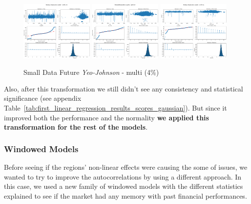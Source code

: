 \documentclass[11pt,english,a4paper,hidelinks]{book}
\begin{document}
\begin{figure}[H]
    \centering
    \includegraphics[width=0.32\textwidth]{images/code/models/linear_regression/first_model/Multi/quality_profit_1m_residuals - Gaussian.png}
    \includegraphics[width=0.32\textwidth]{images/code/models/linear_regression/first_model/Multi/quality_profit_1y_residuals - Gaussian.png}
    \includegraphics[width=0.32\textwidth]{images/code/models/linear_regression/first_model/Multi/quality_profit_5y_residuals - Gaussian.png}
    \caption{Small Data Future \textit{Yeo-Johnson} - \acrshort{multi} (4\%)}
    \label{fig:first_linear_regression_gaussian_residuals}
\end{figure}

\noindent Also, after this transformation we still didn't see any consistency and statistical significance (see appendix Table~\ref{tab:first_linear_regression_results_scores_gaussian}). But since it improved both the performance and the normality \textbf{we applied this transformation for the rest of the models}.

\subsubsection{Windowed Models}

\noindent Before seeing if the regions' non-linear effects were causing the some of issues, we wanted to try to improve the autocorrelations by using a different approach. In this case, we used a new family of windowed models with the different statistics explained to see if the market had any memory with past financial performances.
\end{document}
